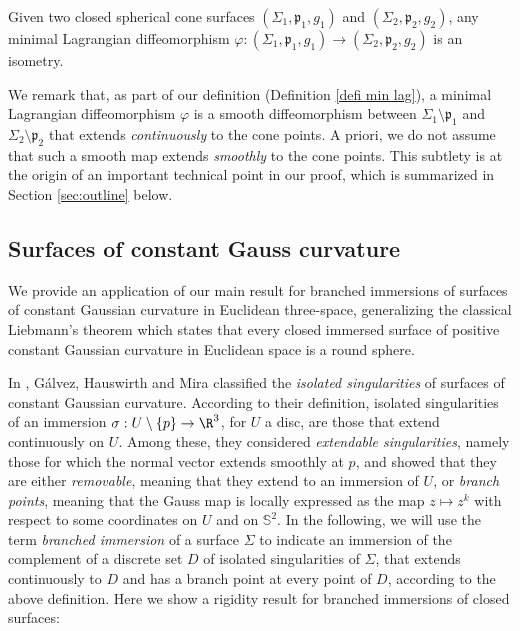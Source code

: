 \begin{theorem}\label{thm:main1}
Given two closed spherical cone surfaces $(\Sigma_1,\mathfrak p_1,g_1)$ and $(\Sigma_2,\mathfrak p_2,g_2)$, any minimal Lagrangian diffeomorphism $\varphi:(\Sigma_1,\mathfrak p_1,g_1)\to(\Sigma_2,\mathfrak p_2,g_2)$ is an isometry.
\end{theorem}

We remark that, as part of our definition (Definition \ref{defi min lag}), a minimal Lagrangian diffeomorphism $\varphi$ is a smooth diffeomorphism between $\Sigma_1\setminus\mathfrak p_1$ and $\Sigma_2\setminus\mathfrak p_2$ that extends \emph{continuously} to the cone points. A priori, we do not assume that such a smooth map extends \emph{smoothly} to the cone points. This subtlety is at the origin of an important technical point in our proof, which is summarized in Section \ref{sec:outline} below.

\subsection{Surfaces of constant Gauss curvature}

We provide an application of our main result for branched immersions of surfaces of constant Gaussian curvature in Euclidean three-space, generalizing the classical Liebmann's theorem which states that every closed immersed surface of positive constant Gaussian curvature in Euclidean space is a round sphere.

In \cite{zbMATH06243957}, Gálvez, Hauswirth and Mira classified the \emph{isolated singularities} of surfaces of constant Gaussian curvature. According to their definition, isolated singularities of an immersion $\sigma:U\setminus\{p\}\to\R^3$, for $U$ a disc, are those that extend continuously on $U$. Among these, they considered \emph{extendable singularities}, namely those for which the normal vector extends smoothly at $p$, and showed that they are either \emph{removable}, meaning that they extend to an immersion of $U$, or \emph{branch points}, meaning that the Gauss map is locally expressed as the map $z\mapsto z^k$ with respect to some coordinates on $U$ and on $\mathbb S^2$. {In the following, we will use the term \emph{branched immersion} of a surface $\Sigma$ to indicate an immersion of the complement of a discrete set $D$ {of isolated singularities} of $\Sigma$, that extends continuously to $D$ and has a branch point at every point of $D$, according to the above definition.} Here we show a rigidity result for branched immersions of closed surfaces:


